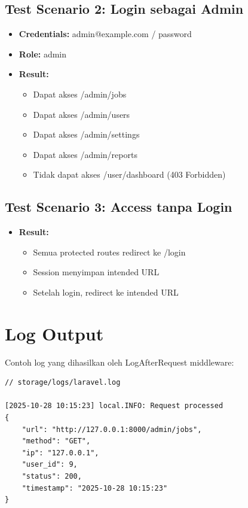\documentclass[a4paper,oneside,11pt]{book}
\begin{document}
\subsection{Test Scenario 2: Login sebagai Admin}
\begin{itemize}
    \item \textbf{Credentials:} admin@example.com / password
    \item \textbf{Role:} admin
    \item \textbf{Result:}
    \begin{itemize}
        \item [\checkmark] Dapat akses /admin/jobs
        \item [\checkmark] Dapat akses /admin/users
        \item [\checkmark] Dapat akses /admin/settings
        \item [\checkmark] Dapat akses /admin/reports
        \item [$\times$] Tidak dapat akses /user/dashboard (403 Forbidden)
    \end{itemize}
\end{itemize}

\subsection{Test Scenario 3: Access tanpa Login}
\begin{itemize}
    \item \textbf{Result:}
    \begin{itemize}
        \item [$\times$] Semua protected routes redirect ke /login
        \item [$\times$] Session menyimpan intended URL
        \item [\checkmark] Setelah login, redirect ke intended URL
    \end{itemize}
\end{itemize}

\section{Log Output}

Contoh log yang dihasilkan oleh LogAfterRequest middleware:

\begin{lstlisting}[style=phpstyle]
// storage/logs/laravel.log

[2025-10-28 10:15:23] local.INFO: Request processed 
{
    "url": "http://127.0.0.1:8000/admin/jobs",
    "method": "GET",
    "ip": "127.0.0.1",
    "user_id": 9,
    "status": 200,
    "timestamp": "2025-10-28 10:15:23"
}
\end{lstlisting}
\end{document}
